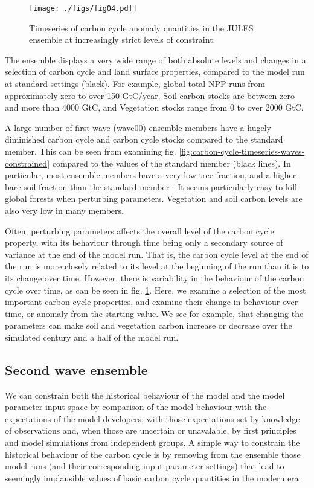 \documentclass[gmd, manuscript]{copernicus}
\begin{document}
%
\begin{figure}[t]
\texttt{[image: ./figs/fig04.pdf]}
\caption{Timeseries of carbon cycle anomaly quantities in the JULES ensemble at increasingly strict levels of constraint.}
\label{fig:carbon-cycle-timeseries-anomaly-waves-constrained}
\end{figure}

The ensemble displays a very wide range of both absolute levels and changes in a selection of carbon cycle and land surface properties, compared to the model run at standard settings (black). For example, global total NPP runs from approximately zero to over 150 GtC/year. Soil carbon stocks are between zero and more than 4000 GtC, and Vegetation stocks range from 0 to over 2000 GtC.

A large number of first wave (wave00) ensemble members have a hugely diminished carbon cycle and carbon cycle stocks compared to the standard member. This can be seen from examining fig. \ref{fig:carbon-cycle-timeseries-waves-constrained} compared to the values of the standard member (black lines). In particular, most ensemble members have a very low tree fraction, and a higher bare soil fraction than the standard member - It seems particularly easy to kill global forests when perturbing parameters. Vegetation and soil carbon levels are also very low in many members. 

Often, perturbing parameters affects the overall level of the carbon cycle property, with its behaviour through time being only a secondary source of variance at the end of the model run. That is, the carbon cycle level at the end of the run is more closely related to its level at the beginning of the run than it is to its change over time. However, there is variability in the behaviour of the carbon cycle over time, as can be seen in fig. \ref{fig:carbon-cycle-timeseries-anomaly-waves-constrained}. Here, we examine a selection of the most important carbon cycle properties, and examine their change in behaviour over time, or anomaly from the starting value. We see for example, that changing the parameters can make soil and vegetation carbon increase or decrease over the simulated century and a half of the model run. 

\subsection{Second wave ensemble}\label{ssec:second_wave}

We can constrain both the historical behaviour of the model and the model parameter input space by comparison of the model behaviour with the expectations of the model developers; with those expectations set by knowledge of observations and, when those are uncertain or unavalable, by first principles and model simulations from independent groups. A simple way to constrain the historical behaviour of the carbon cycle is by removing from the ensemble those model runs (and their corresponding input parameter settings) that lead to seemingly implausible values of basic carbon cycle quantities in the modern era.
\end{document}
